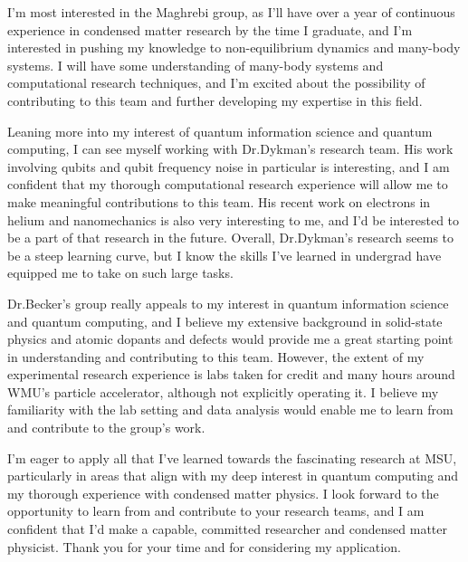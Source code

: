 \documentclass[11pt]{article}
\newcommand{\schoolabbr}{MSU}
\begin{document}
I'm most interested in the Maghrebi group, as I'll have over a year of continuous experience in condensed matter research by the time I graduate, and I'm interested in pushing my knowledge to non-equilibrium dynamics and many-body systems. I will have some understanding of many-body systems and computational research techniques, and I'm excited about the possibility of contributing to this team and further developing my expertise in this field.

Leaning more into my interest of quantum information science and quantum computing, I can see myself working with Dr.\@ Dykman's research team. His work involving qubits and qubit frequency noise in particular is interesting, and I am confident that my thorough computational research experience will allow me to make meaningful contributions to this team. His recent work on electrons in helium and nanomechanics is also very interesting to me, and I'd be interested to be a part of that research in the future. Overall, Dr.\@ Dykman's research seems to be a steep learning curve, but I know the skills I've learned in undergrad have equipped me to take on such large tasks.

Dr.\@ Becker's group really appeals to my interest in quantum information science and quantum computing, and I believe my extensive background in solid-state physics and atomic dopants and defects would provide me a great starting point in understanding and contributing to this team. However, the extent of my experimental research experience is labs taken for credit and many hours around WMU's particle accelerator, although not explicitly operating it. I believe my familiarity with the lab setting and data analysis would enable me to learn from and contribute to the group's work.

I'm eager to apply all that I've learned towards the fascinating research at \schoolabbr{}, particularly in areas that align with my deep interest in quantum computing and my thorough experience with condensed matter physics. I look forward to the opportunity to learn from and contribute to your research teams, and I am confident that I'd make a capable, committed researcher and condensed matter physicist. Thank you for your time and for considering my application.
\end{document}
